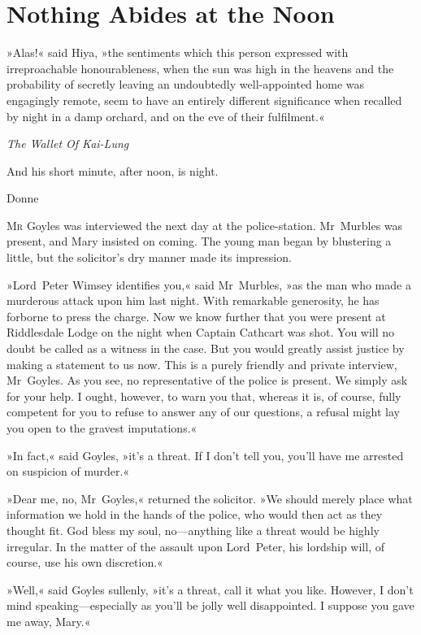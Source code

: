 

\chapter{Nothing Abides at the Noon}


\epigraph{»Alas!« said Hiya, »the sentiments which this person expressed with irreproachable honourableness, when the sun was high in the heavens and the probability of secretly leaving an undoubtedly well-appointed home was engagingly remote, seem to have an entirely different significance when recalled by night in a damp orchard, and on the eve of their fulfilment.«}{\textit{The Wallet Of Kai-Lung}}

\epigraph{And his short minute, after noon, is night.}{Donne}


\lettrine[lines=4]{M}{r} Goyles was interviewed the next day at the police-station. Mr~Murbles was present, and Mary insisted on coming. The young man began by blustering a little, but the solicitor's dry manner made its impression.

»Lord~Peter Wimsey identifies you,« said Mr~Murbles, »as the man who made a murderous attack upon him last night. With remarkable generosity, he has forborne to press the charge. Now we know further that you were present at Riddlesdale Lodge on the night when Captain Cathcart was shot. You will no doubt be called as a witness in the case. But you would greatly assist justice by making a statement to us now. This is a purely friendly and private interview, Mr~Goyles.  As you see, no representative of the police is present. We simply ask for your help. I ought, however, to warn you that, whereas it is, of course, fully competent for you to refuse to answer any of our questions, a refusal might lay you open to the gravest imputations.«

»In fact,« said Goyles, »it's a threat. If I don't tell you, you'll have me arrested on suspicion of murder.«

»Dear me, no, Mr~Goyles,« returned the solicitor. »We should merely place what information we hold in the hands of the police, who would then act as they thought fit. God bless my soul, no—anything like a threat would be highly irregular. In the matter of the assault upon Lord~Peter, his lordship will, of course, use his own discretion.«

»Well,« said Goyles sullenly, »it's a threat, call it what you like.  However, I don't mind speaking—especially as you'll be jolly well disappointed. I suppose you gave me away, Mary.«

